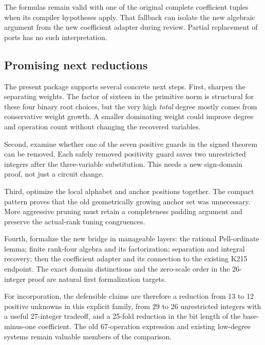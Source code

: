 The formulas remain valid with one of the original complete coefficient
tuples when its compiler hypotheses apply.  That fallback can isolate
the new algebraic argument from the new coefficient adapter during
review.  Partial replacement of ports has no such interpretation.

\subsection{Promising next reductions}

The present package supports several concrete next steps.
First, sharpen the separating weights.  The factor of sixteen in the
primitive norm is structural for these four binary root choices, but
the very high \emph{total} degree mostly comes from conservative weight
growth.  A smaller dominating weight could improve degree and operation
count without changing the recovered variables.

Second, examine whether one of the seven positive guards in the signed
theorem can be removed.  Each safely removed positivity guard saves
two unrestricted integers after the three-variable substitution.
This needs a new sign-domain proof, not just a circuit change.

Third, optimize the local alphabet and anchor positions together.
The compact pattern proves that the old geometrically growing anchor
set was unnecessary.  More aggressive pruning must retain a completeness
padding argument and preserve the actual-rank tuning congruences.

Fourth, formalize the new bridge in manageable layers: the rational
Pell-ordinate lemma; finite rank-four algebra and its factorization;
separation and integral recovery; then the coefficient adapter and its
connection to the existing K215 endpoint.  The exact domain distinctions
and the zero-scale order in the 26-integer proof are natural first
formalization targets.

For incorporation, the defensible claims are therefore a reduction
from 13 to 12 positive unknowns in this explicit family, from 29 to 26
unrestricted integers with a useful 27-integer tradeoff, and a 25-fold
reduction in the bit length of the base-minus-one coefficient.
The old 67-operation expression and existing low-degree systems remain
valuable members of the comparison.
